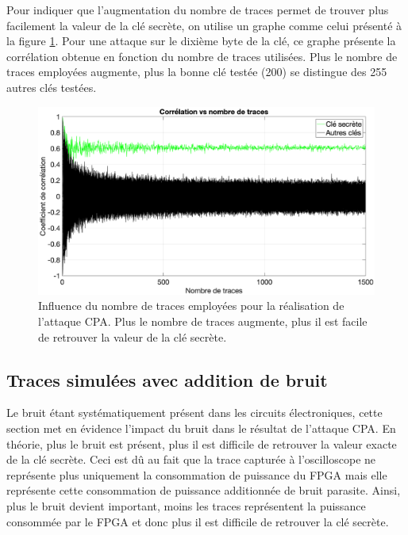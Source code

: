 \documentclass[oneside]{book}
\begin{document}
Pour indiquer que l’augmentation du nombre de traces permet de trouver plus facilement la valeur de la clé secrète, on utilise un graphe comme celui présenté à la figure \ref{fig:sim_corr_fonction_nb_traces}. Pour une attaque sur le dixième byte de la clé, ce graphe présente la corrélation obtenue en fonction du nombre de traces utilisées. Plus le nombre de traces employées augmente, plus la bonne clé testée (200) se distingue des 255 autres clés testées.

\begin{figure}[htbp]
    \hspace{-2.5cm}
    \includegraphics[scale=0.41]{image/sim_corr_fonction_nb_traces}
    \caption{Influence du nombre de traces employées pour la réalisation de l'attaque CPA. Plus le nombre de traces augmente, plus il est facile de retrouver la valeur de la clé secrète.}
    \label{fig:sim_corr_fonction_nb_traces} 
\end{figure}

\subsection{Traces simulées avec addition de bruit}
\label{sec:sim_trace_noise}

Le bruit étant systématiquement présent dans les circuits électroniques, cette section met en évidence l'impact du bruit dans le résultat de l'attaque CPA. En théorie, plus le bruit est présent, plus il est difficile de retrouver la valeur exacte de la clé secrète. Ceci est dû au fait que la trace capturée à l'oscilloscope ne représente plus uniquement la consommation de puissance du FPGA mais elle représente cette consommation de puissance additionnée de bruit parasite. Ainsi, plus le bruit devient important, moins les traces représentent la puissance consommée par le FPGA et donc plus il est difficile de retrouver la clé secrète. 
\end{document}
